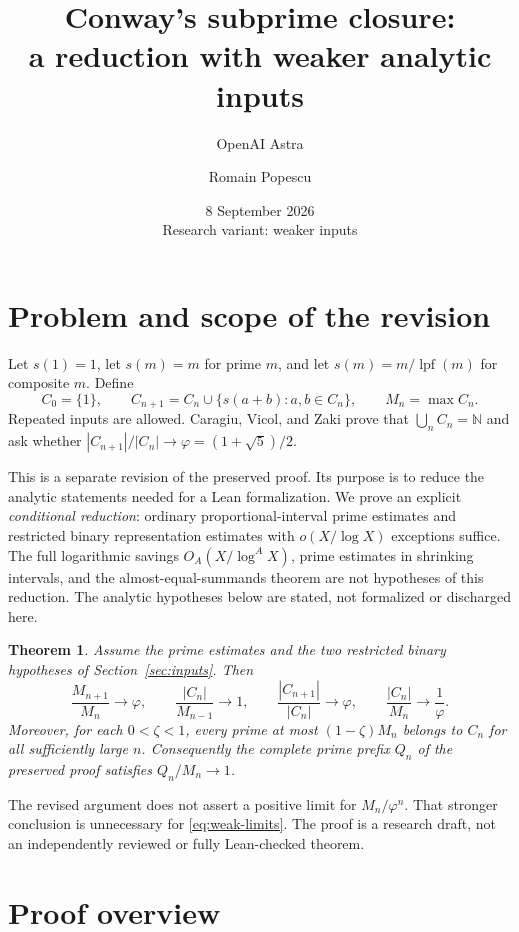 \documentclass[11pt,letterpaper]{article}
\title{Conway's subprime closure:\\a reduction with weaker analytic inputs}
\author{OpenAI Astra \and Romain Popescu}
\date{8 September 2026\\[3pt]\small Research variant: weaker inputs}
\numberwithin{equation}{section}
\newtheorem{theorem}{Theorem}[section]
\theoremstyle{remark}
\DeclareMathOperator{\lpf}{lpf}
\newcommand{\N}{\mathbb N}
\newcommand{\ph}{\varphi}
\begin{document}
\maketitle
\vspace{-1.2em}

\section{Problem and scope of the revision}

Let $s(1)=1$, let $s(m)=m$ for prime $m$, and let
$s(m)=m/\lpf(m)$ for composite $m$. Define
\[
 C_0=\{1\},\qquad C_{n+1}=C_n\cup\{s(a+b):a,b\in C_n\},
 \qquad M_n=\max C_n.
\]
Repeated inputs are allowed. Caragiu, Vicol, and Zaki
\cite[Theorem~1 and Conjecture~3]{CVZ} prove that $\bigcup_n C_n=\N$
and ask whether $|C_{n+1}|/|C_n|\to\ph=(1+\sqrt5)/2$.

This is a separate revision of the preserved proof. Its purpose is to
reduce the analytic statements needed for a Lean formalization. We prove
an explicit \emph{conditional reduction}: ordinary proportional-interval
prime estimates and restricted binary representation estimates with
$o(X/\log X)$ exceptions suffice. The full logarithmic savings
$O_A(X/\log^A X)$, prime estimates in shrinking intervals, and the
almost-equal-summands theorem are not hypotheses of this reduction.
The analytic hypotheses below are stated, not formalized or discharged here.

\begin{theorem}\label{thm:weak-main}
Assume the prime estimates and the two restricted binary hypotheses of
Section~\ref{sec:inputs}. Then
\begin{equation}\label{eq:weak-limits}
 \frac{M_{n+1}}{M_n}\longrightarrow\ph,\qquad
 \frac{|C_n|}{M_{n-1}}\longrightarrow1,\qquad
 \frac{|C_{n+1}|}{|C_n|}\longrightarrow\ph,\qquad
 \frac{|C_n|}{M_n}\longrightarrow\frac1\ph.
\end{equation}
Moreover, for each $0<\zeta<1$, every prime at most $(1-\zeta)M_n$
belongs to $C_n$ for all sufficiently large $n$. Consequently the complete
prime prefix $Q_n$ of the preserved proof satisfies $Q_n/M_n\to1$.
\end{theorem}

The revised argument does not assert a positive limit for $M_n/\ph^n$.
That stronger conclusion is unnecessary for \eqref{eq:weak-limits}.
The proof is a research draft, not an independently reviewed or fully
Lean-checked theorem.

\section{Proof overview}
\end{document}
